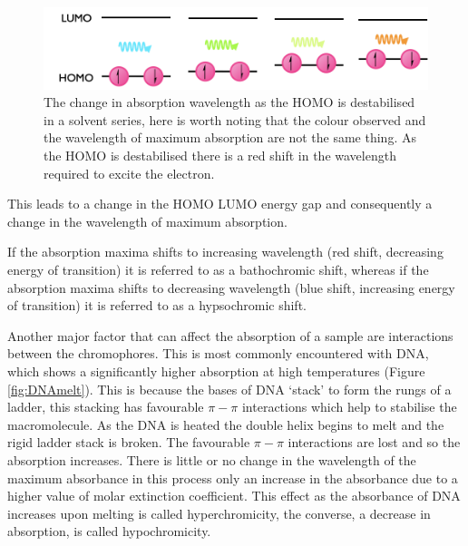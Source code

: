 \documentclass[
]{book}
\begin{document}
\begin{figure}

{\centering \includegraphics[width=1\linewidth]{images/Solvatochromism} 

}

\caption{The change in absorption wavelength as the HOMO is destabilised in a solvent series, here is worth noting that the colour observed and the wavelength of maximum absorption are not the same thing. As the HOMO is destabilised there is a red shift in the wavelength required to excite the electron.}\label{fig:solvato}
\end{figure}

This leads to a change in the HOMO LUMO energy gap and consequently a change in the wavelength of maximum absorption.

If the absorption maxima shifts to increasing wavelength (red shift, decreasing energy of transition) it is referred to as a bathochromic shift, whereas if the absorption maxima shifts to decreasing wavelength (blue shift, increasing energy of transition) it is referred to as a hypsochromic shift.

Another major factor that can affect the absorption of a sample are interactions between the chromophores. This is most commonly encountered with DNA, which shows a significantly higher absorption at high temperatures (Figure \ref{fig:DNAmelt}). This is because the bases of DNA `stack' to form the rungs of a ladder, this stacking has favourable \(\pi - \pi\) interactions which help to stabilise the macromolecule. As the DNA is heated the double helix begins to melt and the rigid ladder stack is broken. The favourable \(\pi - \pi\) interactions are lost and so the absorption increases. There is little or no change in the wavelength of the maximum absorbance in this process only an increase in the absorbance due to a higher value of molar extinction coefficient. This effect as the absorbance of DNA increases upon melting is called hyperchromicity, the converse, a decrease in absorption, is called hypochromicity.
\end{document}
